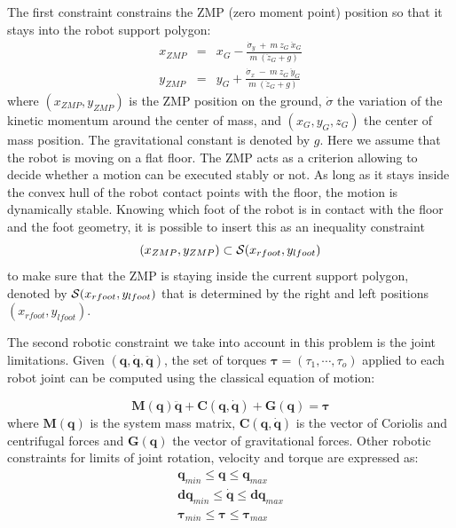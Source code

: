 \documentclass[letterpaper, 10 pt, conference]{ieeeconf}  %
\begin{document}
The first constraint constrains the ZMP (zero moment point) position
so that it stays into the robot support polygon:
\begin{equation}
  \begin{array}{ccc}
    x_{ZMP} &=& x_G - \frac{\dot{\sigma}_y\ +\ m\ z_G\ \ddot{x}_G}{m\ (\ddot{z}_G + g)} \\
    y_{ZMP} &=& y_G + \frac{\dot{\sigma}_x\ -\ m\ z_G\ \ddot{y}_G}{m\ (\ddot{z}_G + g)}
    \end{array}
\label{eq:zmp}
\end{equation}
where $(x_{ZMP}, y_{ZMP})$ is the ZMP position on the
ground, $\dot{\sigma}$ the variation of the kinetic momentum around
the center of mass, and $(x_G, y_G, z_G)$ the center of mass
position. The gravitational constant is denoted by $g$.
Here we assume that the robot is moving on a flat floor.
The ZMP acts as a criterion allowing to decide whether a motion can be
executed stably or not. As long as it stays inside the convex hull of the
robot contact points with the floor, the motion is dynamically stable.
Knowing which foot of the robot is in contact with the floor and the
foot geometry, it is possible to insert this  as an
inequality constraint
\begin{equation}
  (x_{ZMP}, y_{ZMP}) \subset {\cal S}(x_{rfoot}, y_{lfoot})
  \label{eq:support}
\end{equation}
to make sure that the ZMP is staying inside the current support
polygon, denoted by ${\cal S}(x_{rfoot}, y_{lfoot})$ that is
determined by the right and left positions $(x_{rfoot}, y_{lfoot})$. 

The second robotic constraint we take into account in this problem
is the joint limitations. Given $(\mathbf{q}, \dot{\mathbf{q}},
\ddot{\mathbf{q}})$, %
the set of torques  $\mathbf{\tau} = (\tau_1, \cdots, \tau_o)$
applied to each robot joint can be computed using the classical
equation of motion: 

\begin{equation}
  \mathbf{M}(\mathbf{q}) \ddot{\mathbf{q}} + \mathbf{C}(\mathbf{q},
  \dot{\mathbf{q}}) + \mathbf{G}(\mathbf{q}) = \mathbf{\tau}
\end{equation}
where $\mathbf{M}(\mathbf{q})$ is the system mass matrix,
$\mathbf{C}(\mathbf{q}, \dot{\mathbf{q}})$ is the vector of Coriolis
and centrifugal forces and $\mathbf{G}(\mathbf{q})$ the vector of
gravitational forces.
Other robotic constraints for limits of joint rotation, velocity and
torque are expressed as:
\begin{equation}
  \begin{array}{ccc}
    \mathbf{q}_{min} \leq \mathbf{q} \leq \mathbf{q}_{max} \\
    \mathbf{dq}_{min} \leq \dot{\mathbf{q}} \leq \mathbf{dq}_{max} \\
    \mathbf{\tau}_{min} \leq \mathbf{\tau} \leq \mathbf{\tau}_{max} \\
    \end{array}
\end{equation}
\end{document}
